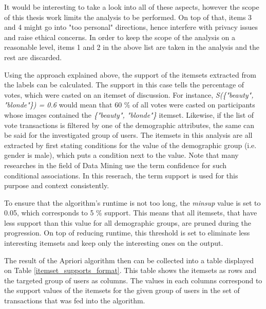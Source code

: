     It would be interesting to take a look into all of these aspects, however the scope of this thesis work limits the analysis to be performed. On top of that, items 3 and 4 might go into "too personal" directions, hence interfere with privacy issues and raise ethical concerns. In order to keep the scope of the analysis on a reasonable level, items 1 and 2 in the above list are taken in the analysis and the rest are discarded. 
    
    Using the approach explained above, the support of the itemsets extracted from the labels can be calculated. The support in this case tells the percentage of votes, which were casted on an itemset of discussion. For instance, \emph{S(\{"beauty", "blonde"\}) = 0.6} would mean that 60 \% of all votes were casted on participants whose images contained the \emph{\{"beauty", "blonde"\}} itemset. Likewise, if the list of vote transactions is filtered by one of the demographic attributes, the same can be said for the investigated group of users. The itemsets in this analysis are all extracted by first stating conditions for the value of the demographic group (i.e. gender is male), which puts a condition next to the value. Note that many researches in the field of Data Mining use the term confidence for such conditional associations. In this reserach, the term support is used for this purpose and context consistently.

    To ensure that the algorithm's runtime is not too long, the \emph{minsup} value is set to 0.05, which corresponds to 5 \% support. This means that all itemsets, that have less support than this value for all demographic groups, are pruned during the progression. On top of reducing runtime, this threshold is set to eliminate less interesting itemsets and keep only the interesting ones on the output.

    The result of the Apriori algorithm then can be collected into a table displayed on Table \ref{itemset_supports_format}. This table shows the itemsets as rows and the targeted group of users as columns. The values in each columns correspond to the support values of the itemsets for the given group of users in the set of transactions that was fed into the algorithm. 


